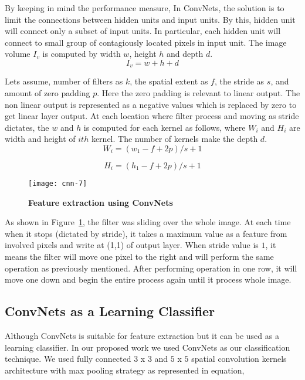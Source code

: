 \documentclass[conference]{IEEEtran}
\begin{document}
By keeping in mind the performance measure, In ConvNets, the solution is to limit the connections between hidden units and input units.
By this, hidden unit will connect only a subset of input units. 
In particular, each hidden unit will connect to small group of contagiously located pixels in input unit.
The image volume $I_v$ is computed by width $w$, height $h$ and depth $d$.
\begin{equation}
    I_v = w+h+d
\end{equation}

Lets assume, number of filters as $k$, 
the spatial extent as $f$, the stride as $s$, and amount of zero padding $p$.
Here the zero padding is relevant to linear output. The non linear output is represented as a negative values which is replaced by zero to get linear layer output.
At each location where filter process and moving as stride dictates, the $w$ and $h$ is computed for each kernel as follows,
where $W_i$ and $H_i$ are width and height of $ith$ kernel.
The number of kernels make the depth $d$.
\begin{equation}
W_i= (w_1-f+2p)/s+1
\end{equation}

\begin{equation}
H_i= (h_1-f+2p)/s+1
\end{equation}

\begin{figure}[H]
\centering
\texttt{[image: cnn-7]}
\caption{\bf Feature extraction using ConvNets}
\label{feature}
\end{figure}

    As shown in Figure~\ref{feature}, the filter was sliding over the whole image. 
    At each time when it stops (dictated by stride), it takes a maximum value as a feature from involved pixels and write at (1,1) of output layer. 
    When stride value is $1$, it means the filter will move one pixel to the right and will perform the same operation as previously mentioned.
    After performing operation in one row, it will move one down and begin the entire process again until it process whole image.

\subsection{ConvNets as a Learning Classifier}
Although ConvNets is suitable for feature extraction but it can be used as a learning classifier. 
In our proposed work we used ConvNets as our classification technique. 
We used fully connected $3$ x $3$ and $5$ x $5$ spatial convolution kernels architecture with max pooling strategy as represented in equation,
\end{document}

